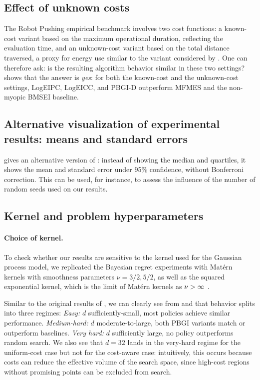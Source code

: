 \documentclass{article}
\begin{document}
\subsection{Effect of unknown costs}
\label{apdx:robot_pushing_cost_aware}

The Robot Pushing empirical benchmark involves two cost functions: a known-cost variant based on the maximum operational duration, reflecting the evaluation time, and an unknown-cost variant based on the total distance traversed, a proxy for energy use similar to the variant considered by \textcite{astudillo2021multi}.
One can therefore ask: is the resulting algorithm behavior similar in these two settings?
 shows that the answer is \emph{yes}: for both the known-cost and the unknown-cost settings, LogEIPC, LogEICC, and PBGI-D outperform MFMES and the non-myopic BMSEI baseline.

\subsection{Alternative visualization of experimental results: means and standard errors}

 gives an alternative version of : instead of showing the median and quartiles, it shows the mean and standard error under 95\% confidence, without Bonferroni correction.
This can be used, for instance, to assess the influence of the number of random seeds used on our results.


\subsection{Kernel and problem hyperparameters}
\label{apdx:kernel}

\paragraph*{Choice of kernel.}

To check whether our results are sensitive to the kernel used for the Gaussian process model, we replicated the Bayesian regret experiments with Matérn kernels with smoothness parameters $\nu = 3/2, 5/2$, as well as the squared exponential kernel, which is the limit of Matérn kernels as $\nu\->\infty$ \cite{rasmussen06}.

Similar to the original results of , we can clearly see from  and  that behavior splits into three regimes:
\1 \emph{Easy:} $d$ sufficiently-small, most policies achieve similar performance.
\2 \emph{Medium-hard:} $d$ moderate-to-large, both PBGI variants match or outperform baselines.
\3 \emph{Very hard:} $d$ sufficiently large, no policy outperforms random search.
\0
We also see that $d=32$ lands in the very-hard regime for the uniform-cost case but not for the cost-aware case: intuitively, this occurs because costs can reduce the effective volume of the search space, since high-cost regions without promising points can be excluded from search.
\end{document}
